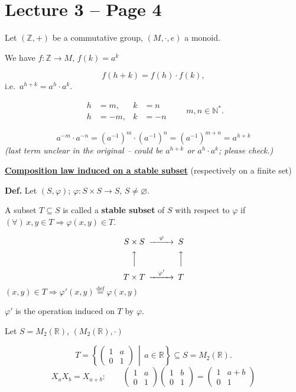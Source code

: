 \documentclass[12pt]{article}
\begin{document}
\section*{Lecture 3 -- Page 4}

\noindent Let $(\mathbb{Z},+)$ be a commutative group, $(M,\cdot,e)$ a monoid.

\noindent We have $f : \mathbb{Z} \to M$, $f(k) = a^k$

\[
f(h+k) = f(h)\cdot f(k),
\]
i.e.\ $a^{h+k} = a^h \cdot a^k$.

\[
\begin{aligned}
h&=m, & k&=n\\
h&=-m, & k&=-n
\end{aligned}
\qquad m,n\in\mathbb{N}^*.
\]

\[
a^{-m}\cdot a^{-n} = (a^{-1})^{m}\cdot(a^{-1})^{n} = (a^{-1})^{m+n} = a^{h+k}
\]
\noindent\textit{(last term unclear in the original -- could be $a^{h+k}$ or $a^h\cdot a^k$; please check.)}

\bigskip
\noindent\underline{\textbf{Composition law induced on a stable subset}} (respectively on a finite set)

\bigskip
\noindent\textbf{Def.} Let $(S,\varphi)$; $\varphi : S\times S \to S$, $S \neq \varnothing$.

\noindent A subset $T \subseteq S$ is called a \textbf{stable subset} of $S$ with respect to $\varphi$ if $(\forall)\, x,y \in T \Rightarrow \varphi(x,y) \in T$.

\[
\begin{CD}
S\times S @>\varphi>> S\\
@AAA @AAA\\
T\times T @>\varphi'>> T
\end{CD}
\]
\noindent $(x,y)\in T \Rightarrow \varphi'(x,y) \overset{\text{def}}{=} \varphi(x,y)$

\noindent $\varphi'$ is the operation induced on $T$ by $\varphi$.

\noindent Let $S = M_2(\mathbb{R})$, $(M_2(\mathbb{R}),\cdot)$

\[
T = \left\{ \begin{pmatrix} 1 & a \\ 0 & 1 \end{pmatrix} \,\middle|\, a\in\mathbb{R} \right\} \subseteq S = M_2(\mathbb{R}).
\]
\[
X_a X_b = X_{a+b}: \qquad \begin{pmatrix}1 & a\\ 0 & 1\end{pmatrix}\begin{pmatrix}1 & b\\ 0 & 1\end{pmatrix} = \begin{pmatrix}1 & a+b\\ 0 & 1\end{pmatrix}
\]
\end{document}
